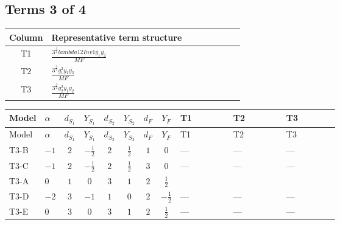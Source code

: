 \documentclass[8pt]{article}
\begin{document}
\begin{landscape}
\subsection*{Terms 3 of 4}
\begin{center}
\begin{tabular}{@{}c >{\raggedright\arraybackslash}p{0.82\linewidth}@{}}
\toprule
Column & Representative term structure \\
\midrule
T1 & \(\displaystyle \frac{3^{\frac{3}{4}} lambda12Inv1 \overline{y_{1}} \overline{y_{2}}}{MF}\) \\
\midrule
T2 & \(\displaystyle \frac{3^{\frac{3}{4}} g_{1}^{2} \overline{y_{1}} \overline{y_{2}}}{MF}\) \\
\midrule
T3 & \(\displaystyle \frac{3^{\frac{3}{4}} g_{2}^{2} \overline{y_{1}} \overline{y_{2}}}{MF}\) \\
\midrule
\bottomrule
\end{tabular}
\end{center}
\smallskip
\tiny
\begin{longtable}{@{}llcccccc >{\raggedright\arraybackslash}p{0.21\linewidth} >{\raggedright\arraybackslash}p{0.21\linewidth} >{\raggedright\arraybackslash}p{0.21\linewidth}@{}}
\toprule
Model & $\alpha$ & $d_{S_1}$ & $Y_{S_1}$ & $d_{S_2}$ & $Y_{S_2}$ & $d_F$ & $Y_F$ & T1 & T2 & T3 \\
\midrule
\endfirsthead
\toprule
Model & $\alpha$ & $d_{S_1}$ & $Y_{S_1}$ & $d_{S_2}$ & $Y_{S_2}$ & $d_F$ & $Y_F$ & T1 & T2 & T3 \\
\midrule
\endhead
T3-B & $-1$ & $2$ & $-\frac{1}{2}$ & $2$ & $\frac{1}{2}$ & $1$ & $0$ & --- & --- & --- \\
\midrule
T3-C & $-1$ & $2$ & $-\frac{1}{2}$ & $2$ & $\frac{1}{2}$ & $3$ & $0$ & --- & --- & --- \\
\midrule
T3-A & $0$ & $1$ & $0$ & $3$ & $1$ & $2$ & $\frac{1}{2}$ & \scriptsize\adjustbox{max width=\linewidth}{$\begin{gathered} \frac{3^{\frac{3}{4}} lambda12Inv1 \overline{y_{1}} \overline{y_{2}}}{6 MF}\end{gathered}$} & \scriptsize\adjustbox{max width=\linewidth}{$\begin{gathered} \frac{3^{\frac{3}{4}} g_{1}^{2} \overline{y_{1}} \overline{y_{2}}}{8 MF}\end{gathered}$} & \scriptsize\adjustbox{max width=\linewidth}{$\begin{gathered} \frac{25 \cdot 3^{\frac{3}{4}} g_{2}^{2} \overline{y_{1}} \overline{y_{2}}}{24 MF}\end{gathered}$} \\
\midrule
T3-D & $-2$ & $3$ & $-1$ & $1$ & $0$ & $2$ & $-\frac{1}{2}$ & --- & --- & --- \\
\midrule
T3-E & $0$ & $3$ & $0$ & $3$ & $1$ & $2$ & $\frac{1}{2}$ & --- & --- & --- \\
\midrule
\bottomrule
\end{longtable}
\clearpage

\end{landscape}
\end{document}
